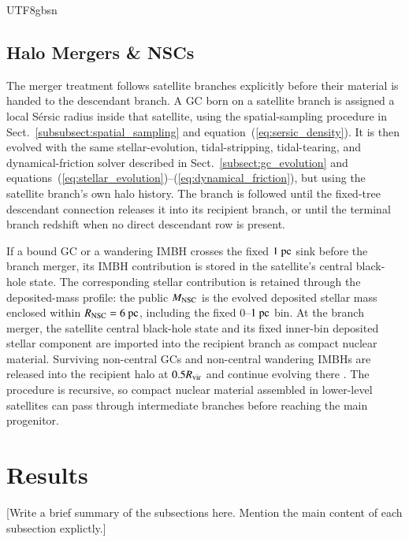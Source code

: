 \documentclass[trackchanges, twocolappendix, twocolumn]{aastex701}
\newcommand{\czkong}[1]{{\color{magenta}#1}}
\begin{document}
\begin{CJK*}{UTF8}{gbsn}
\subsection{Halo Mergers \& NSCs} \label{subsect:merge}

The merger treatment follows satellite branches explicitly before their material is handed to the descendant branch. A GC born on a satellite branch is assigned a local S{\'e}rsic radius inside that satellite, using the spatial-sampling procedure in Sect.~\ref{subsubsect:spatial_sampling} and equation~(\ref{eq:sersic_density}). It is then evolved with the same stellar-evolution, tidal-stripping, tidal-tearing, and dynamical-friction solver described in Sect.~\ref{subsect:gc_evolution} and equations~(\ref{eq:stellar_evolution})--(\ref{eq:dynamical_friction}), but using the satellite branch's own halo history. The branch is followed until the fixed-tree descendant connection releases it into its recipient branch, or until the terminal branch redshift when no direct descendant row is present.

If a bound GC or a wandering IMBH crosses the fixed $1~{\rm pc}$ sink before the branch merger, its IMBH contribution is stored in the satellite's central black-hole state. The corresponding stellar contribution is retained through the deposited-mass profile: the public $M_{\rm NSC}$ is the evolved deposited stellar mass enclosed within $R_{\rm NSC}=6~{\rm pc}$, including the fixed $0$--$1~{\rm pc}$ bin. At the branch merger, the satellite central black-hole state and its fixed inner-bin deposited stellar component are imported into the recipient branch as compact nuclear material. Surviving non-central GCs and non-central wandering IMBHs are released into the recipient halo at $0.5R_{\rm vir}$ and continue evolving there \citep{Gao+2024GC}. The procedure is recursive, so compact nuclear material assembled in lower-level satellites can pass through intermediate branches before reaching the main progenitor.

\section{Results} \label{sect:result}

\czkong{[Write a brief summary of the subsections here. Mention the main content of each subsection explictly.]}


\end{CJK*}
\end{document}
